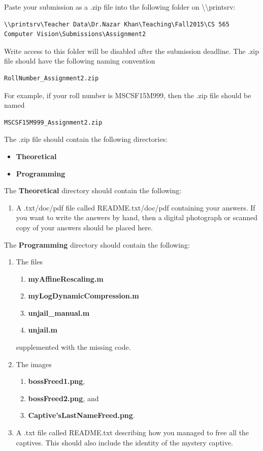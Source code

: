\documentclass[11pt]{article} %
\begin{document}
Paste your submission as a .zip file into the following folder on \textbackslash\textbackslash printsrv:
\begin{lstlisting}
\\printsrv\Teacher Data\Dr.Nazar Khan\Teaching\Fall2015\CS 565 Computer Vision\Submissions\Assignment2
\end{lstlisting}
Write access to this folder will be disabled after the submission deadline. The .zip file should have the following naming convention 
\begin{verbatim}
RollNumber_Assignment2.zip
\end{verbatim}
For example, if your roll number is MSCSF15M999, then the .zip file should be named \begin{verbatim}
MSCSF15M999_Assignment2.zip
\end{verbatim}
The .zip file should contain the following directories:
\begin{itemize}
\item \textbf{Theoretical}
\item \textbf{Programming}
\end{itemize}
The \textbf{Theoretical} directory should contain the following:
\begin{enumerate}
\item A .txt/doc/pdf file called README.txt/doc/pdf containing your answers. If you want to write the answers by hand, then a digital photograph or scanned copy of your answers should be placed here.
\end{enumerate}
The \textbf{Programming} directory should contain the following:
\begin{enumerate}
\item The files 
\begin{enumerate}
\item \textbf{myAffineRescaling.m}
\item \textbf{myLogDynamicCompression.m}
\item \textbf{unjail\_manual.m}
\item \textbf{unjail.m}
\end{enumerate}
 supplemented with the missing code.
\item The images 
\begin{enumerate}
\item \textbf{bossFreed1.png},
\item \textbf{bossFreed2.png}, and
\item \textbf{Captive'sLastNameFreed.png}.
\end{enumerate}
\item A .txt file called README.txt describing how you managed to free all the captives. This should also include the identity of the mystery captive.
\end{enumerate}
\end{document}
